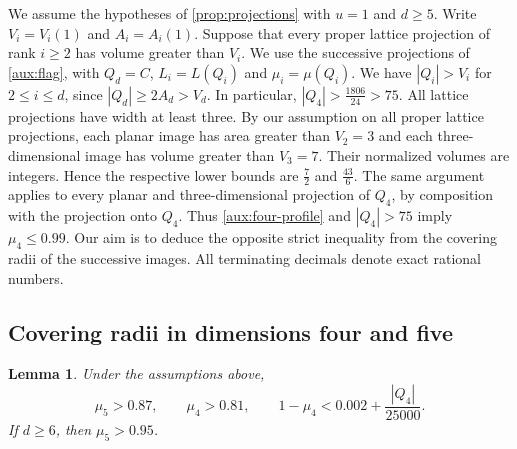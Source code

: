 \documentclass[reqno, 11pt]{article}
\numberwithin{equation}{section}
\newtheorem{lemma}[lemma]{Lemma}
\theoremstyle{definition}
\begin{document}
We assume the hypotheses of \cref{prop:projections} with $u=1$ and
$d\ge5$. Write $V_i=V_i(1)$ and $A_i=A_i(1)$. Suppose that every
proper lattice projection of rank $i\ge2$ has volume greater than
$V_i$. We use the successive projections of \cref{aux:flag}, with
$Q_d=C$, $L_i=L(Q_i)$ and $\mu_i=\mu(Q_i)$. We have $|Q_i|>V_i$
for $2\le i\le d$, since $|Q_d|\ge2A_d>V_d$. In particular,
$|Q_4|>\frac{1806}{24}>75$. All lattice projections have width at
least three. By our assumption on all proper lattice projections, each planar image has
area greater than $V_2=3$ and each three-dimensional image has volume
greater than $V_3=7$. Their normalized volumes are integers. Hence the
respective lower bounds are $\frac{7}{2}$ and $\frac{43}{6}$. The same argument applies to every planar and
three-dimensional projection of $Q_4$, by composition with the
projection onto $Q_4$. Thus \cref{aux:four-profile} and $|Q_4|>75$
imply $\mu_4\le0.99$. Our aim is to deduce the opposite strict
inequality from the covering radii of the successive images.
All terminating decimals denote exact rational numbers.

\subsection{Covering radii in dimensions four and five}

\begin{lemma}\label{lem:wide-radius}
Under the assumptions above,
\begin{equation}\label{eq:wide-loss-direct}
 \mu_5>0.87,\qquad \mu_4>0.81,\qquad
                 1-\mu_4<0.002+\frac{|Q_4|}{25000}.
\end{equation}
If $d\ge6$, then $\mu_5>0.95$.
\end{lemma}
\end{document}
